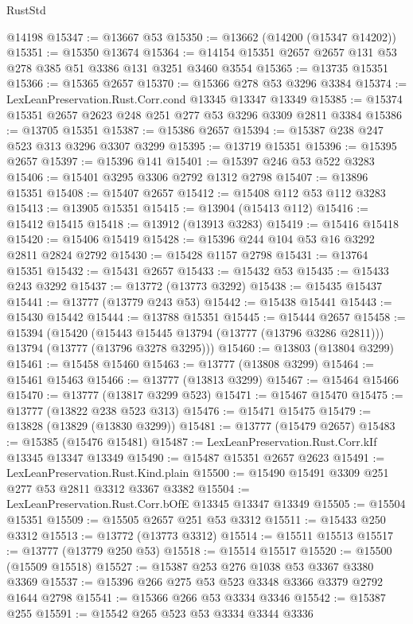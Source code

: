 \begin{lexlean}{RustStd}
\begin{coremodule}
    @14198
@15347 := @13667 @53
@15350 := @13662 (@14200 (@15347 @14202))
@15351 := @15350 @13674
@15364 := @14154 @15351 @2657 @2657 @131 @53 @278 @385 @51 @3386 @131 @3251 @3460 @3554
@15365 := @13735 @15351
@15366 := @15365 @2657
@15370 := @15366 @278 @53 @3296 @3384
@15374 := LexLeanPreservation.Rust.Corr.cond @13345 @13347 @13349
@15385 := @15374 @15351 @2657 @2623 @248 @251 @277 @53 @3296 @3309 @2811 @3384
@15386 := @13705 @15351
@15387 := @15386 @2657
@15394 := @15387 @238 @247 @523 @313 @3296 @3307 @3299
@15395 := @13719 @15351
@15396 := @15395 @2657
@15397 := @15396 @141
@15401 := @15397 @246 @53 @522 @3283
@15406 := @15401 @3295 @3306 @2792 @1312 @2798
@15407 := @13896 @15351
@15408 := @15407 @2657
@15412 := @15408 @112 @53 @112 @3283
@15413 := @13905 @15351
@15415 := @13904 (@15413 @112)
@15416 := @15412 @15415
@15418 := @13912 (@13913 @3283)
@15419 := @15416 @15418
@15420 := @15406 @15419
@15428 := @15396 @244 @104 @53 @16 @3292 @2811 @2824 @2792
@15430 := @15428 @1157 @2798
@15431 := @13764 @15351
@15432 := @15431 @2657
@15433 := @15432 @53
@15435 := @15433 @243 @3292
@15437 := @13772 (@13773 @3292)
@15438 := @15435 @15437
@15441 := @13777 (@13779 @243 @53)
@15442 := @15438 @15441
@15443 := @15430 @15442
@15444 := @13788 @15351
@15445 := @15444 @2657
@15458 := @15394
    (@15420
      (@15443 @15445 @13794 (@13777 (@13796 @3286 @2811)))
      @13794
      (@13777 (@13796 @3278 @3295)))
@15460 := @13803 (@13804 @3299)
@15461 := @15458 @15460
@15463 := @13777 (@13808 @3299)
@15464 := @15461 @15463
@15466 := @13777 (@13813 @3299)
@15467 := @15464 @15466
@15470 := @13777 (@13817 @3299 @523)
@15471 := @15467 @15470
@15475 := @13777 (@13822 @238 @523 @313)
@15476 := @15471 @15475
@15479 := @13828 (@13829 (@13830 @3299))
@15481 := @13777 (@15479 @2657)
@15483 := @15385 (@15476 @15481)
@15487 := LexLeanPreservation.Rust.Corr.kIf @13345 @13347 @13349
@15490 := @15487 @15351 @2657 @2623
@15491 := LexLeanPreservation.Rust.Kind.plain
@15500 := @15490 @15491 @3309 @251 @277 @53 @2811 @3312 @3367 @3382
@15504 := LexLeanPreservation.Rust.Corr.bOfE @13345 @13347 @13349
@15505 := @15504 @15351
@15509 := @15505 @2657 @251 @53 @3312
@15511 := @15433 @250 @3312
@15513 := @13772 (@13773 @3312)
@15514 := @15511 @15513
@15517 := @13777 (@13779 @250 @53)
@15518 := @15514 @15517
@15520 := @15500 (@15509 @15518)
@15527 := @15387 @253 @276 @1038 @53 @3367 @3380 @3369
@15537 := @15396 @266 @275 @53 @523 @3348 @3366 @3379 @2792 @1644 @2798
@15541 := @15366 @266 @53 @3334 @3346
@15542 := @15387 @255
@15591 := @15542
    @265
    @523
    @53
    @3334
    @3344
    @3336

\end{coremodule}
\end{lexlean}
